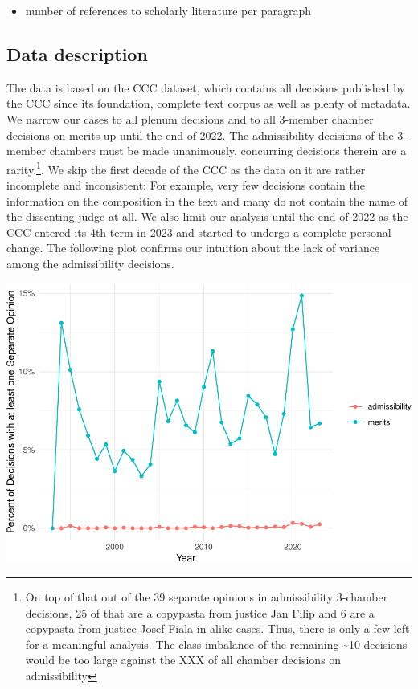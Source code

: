 \documentclass[
  11pt,
]{article}
\providecommand{\tightlist}{%
  \setlength{\itemsep}{0pt}\setlength{\parskip}{0pt}}
\begin{document}
\begin{itemize}
\begin{itemize}
    \begin{itemize}
    \tightlist
    \item
      number of references to scholarly literature per paragraph
    \end{itemize}
  \end{itemize}
\end{itemize}

\hypertarget{data-description}{%
\subsection{Data description}\label{data-description}}

The data is based on the CCC dataset, which contains all decisions
published by the CCC since its foundation, complete text corpus as well
as plenty of metadata. We narrow our cases to all plenum decisions and
to all 3-member chamber decisions on merits up until the end of 2022.
The admissibility decisions of the 3-member chambers must be made
unanimously, concurring decisions therein are a rarity.\footnote{On top
  of that out of the 39 separate opinions in admissibility 3-chamber
  decisions, 25 of that are a copypasta from justice Jan Filip and 6 are
  a copypasta from justice Josef Fiala in alike cases. Thus, there is
  only a few left for a meaningful analysis. The class imbalance of the
  remaining \textasciitilde10 decisions would be too large against the
  XXX of all chamber decisions on admissibility}. We skip the first
decade of the CCC as the data on it are rather incomplete and
inconsistent: For example, very few decisions contain the information on
the composition in the text and many do not contain the name of the
dissenting judge at all. We also limit our analysis until the end of
2022 as the CCC entered its 4th term in 2023 and started to undergo a
complete personal change. The following plot confirms our intuition
about the lack of variance among the admissibility decisions.

\includegraphics{separate_opinions_files/figure-latex/unnamed-chunk-1-1.pdf}
\end{document}
